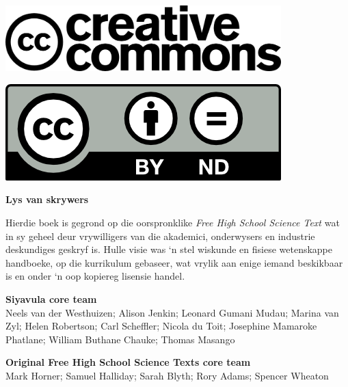 \vspace*{4in}

\begin{center}
\begin{minipage}{0.6\textwidth}
\includegraphics[width=0.8\textwidth]{title_images/cc2.png}
\end{minipage}
\begin{minipage}{0.3\textwidth}
\includegraphics[width=0.8\textwidth]{title_images/cc1.png}
\end{minipage}
\end{center}

\newpage
\thispagestyle{empty}


\begin{flushleft} \textbf{\LARGE  Lys van skrywers} \end{flushleft}

{Hierdie boek is gegrond op die oorspronklike \textsl{Free High School Science Text} wat in sy geheel deur vrywilligers van die akademici, onderwysers en industrie deskundiges geskryf is. Hulle visie was ‘n stel wiskunde en fisiese wetenskappe handboeke, op die kurrikulum gebaseer, wat vrylik aan enige iemand beskikbaar is en onder ‘n oop kopiereg lisensie handel.} \par

\textbf{\large Siyavula core team} \\

Neels van der Westhuizen; Alison Jenkin; Leonard Gumani Mudau; Marina van Zyl; Helen Robertson; Carl Scheffler; Nicola du Toit; Josephine Mamaroke Phatlane; William Buthane Chauke; Thomas Masango \par

\textbf{\large Original Free High School Science Texts core team}\\

Mark Horner; Samuel Halliday; Sarah Blyth; Rory Adams; Spencer Wheaton \par 


